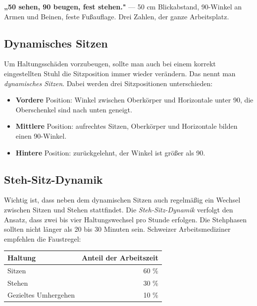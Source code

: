 \documentclass[11pt, a4paper]{article}
\begin{document}
\begin{eselsbruecke}
\textbf{„50 sehen, 90 beugen, fest stehen."} --- 50 cm Blickabstand, 90\textdegree-Winkel an
Armen und Beinen, feste Fußauflage. Drei Zahlen, der ganze Arbeitsplatz.
\end{eselsbruecke}

\subsection{Dynamisches Sitzen}

Um Haltungsschäden vorzubeugen, sollte man auch bei einem korrekt eingestellten Stuhl die
Sitzposition immer wieder verändern. Das nennt man \emph{dynamisches Sitzen}. Dabei werden
drei Sitzpositionen unterschieden:

\begin{itemize}
  \item \textbf{Vordere} Position: Winkel zwischen Oberkörper und Horizontale unter
    90\textdegree, die Oberschenkel sind nach unten geneigt.
  \item \textbf{Mittlere} Position: aufrechtes Sitzen, Oberkörper und Horizontale bilden
    einen 90\textdegree-Winkel.
  \item \textbf{Hintere} Position: zurückgelehnt, der Winkel ist größer als 90\textdegree.
\end{itemize}

\subsection{Steh-Sitz-Dynamik}

Wichtig ist, dass neben dem dynamischen Sitzen auch regelmäßig ein Wechsel zwischen Sitzen
und Stehen stattfindet. Die \emph{Steh-Sitz-Dynamik} verfolgt den Ansatz, dass zwei bis vier
Haltungswechsel pro Stunde erfolgen. Die Stehphasen sollten nicht länger als 20 bis 30
Minuten sein. Schweizer Arbeitsmediziner empfehlen die Faustregel:

\begin{center}
\begin{tabular}{l r}
\toprule
\textbf{Haltung} & \textbf{Anteil der Arbeitszeit}\\
\midrule
Sitzen & 60 \%\\
Stehen & 30 \%\\
Gezieltes Umhergehen & 10 \%\\
\bottomrule
\end{tabular}
\end{center}
\end{document}
